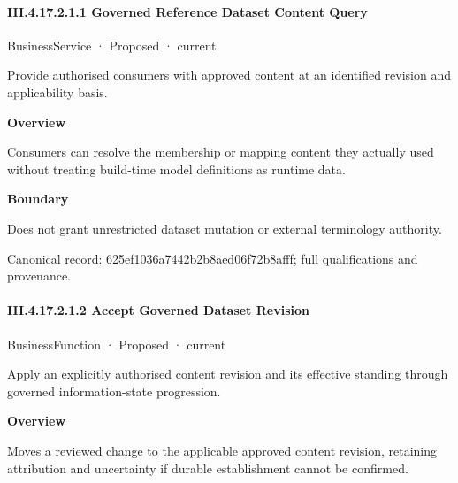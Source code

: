 \paragraph*{III.4.17.2.1.1 Governed Reference Dataset Content Query}
\label{navigation:III.4.17.2.1.1}

\label{element:625ef1036a7442b2b8aed06f72b8afff}
{\small BusinessService · Proposed · current}\par

Provide authorised consumers with approved content at an identified revision and applicability basis.



\textbf{Overview}



Consumers can resolve the membership or mapping content they actually used without treating build-time model definitions as runtime data.



\textbf{Boundary}



Does not grant unrestricted dataset mutation or external terminology authority.


{\footnotesize \href{../../../../../../../../continuum/business/business-service/625ef1036a7442b2b8aed06f72b8afff.md}{Canonical record: 625ef1036a7442b2b8aed06f72b8afff}; full qualifications and provenance.}\par
\paragraph*{III.4.17.2.1.2 Accept Governed Dataset Revision}
\label{navigation:III.4.17.2.1.2}

\label{element:96c1c089e7f2443dbd3ad5beab6a3011}
{\small BusinessFunction · Proposed · current}\par

Apply an explicitly authorised content revision and its effective standing through governed information-state progression.



\textbf{Overview}



Moves a reviewed change to the applicable approved content revision, retaining attribution and uncertainty if durable establishment cannot be confirmed.



